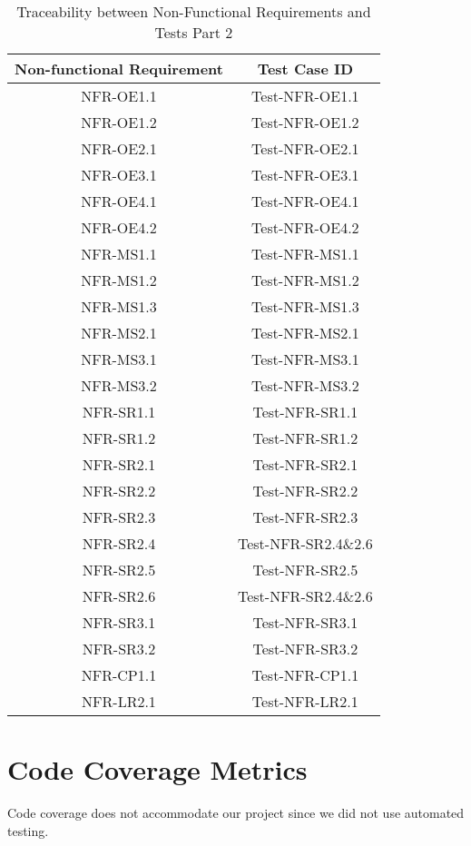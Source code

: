 \documentclass[12pt, titlepage]{article}
\begin{document}
\begin{table}[H]
    \centering
    \begin{tabular}{|c|c|}
    \hline
    Non-functional Requirement & Test Case ID\\
    \hline
    NFR-OE1.1 & Test-NFR-OE1.1\\
    \hline
    NFR-OE1.2 & Test-NFR-OE1.2\\
    \hline
    NFR-OE2.1 & Test-NFR-OE2.1\\
    \hline
    NFR-OE3.1 & Test-NFR-OE3.1\\
    \hline
    NFR-OE4.1 & Test-NFR-OE4.1\\
    \hline
    NFR-OE4.2 & Test-NFR-OE4.2\\
    \hline
    NFR-MS1.1 & Test-NFR-MS1.1\\
    \hline
    NFR-MS1.2 & Test-NFR-MS1.2\\
    \hline
    NFR-MS1.3 & Test-NFR-MS1.3\\
    \hline
    NFR-MS2.1 & Test-NFR-MS2.1\\
    \hline
    NFR-MS3.1 & Test-NFR-MS3.1\\
    \hline
    NFR-MS3.2 & Test-NFR-MS3.2\\
    \hline
    NFR-SR1.1 & Test-NFR-SR1.1\\
    \hline
    NFR-SR1.2 & Test-NFR-SR1.2\\
    \hline
    NFR-SR2.1 & Test-NFR-SR2.1\\
    \hline
    NFR-SR2.2 & Test-NFR-SR2.2\\
    \hline
    NFR-SR2.3 & Test-NFR-SR2.3\\
    \hline
    NFR-SR2.4 & Test-NFR-SR2.4\&2.6\\
    \hline
    NFR-SR2.5 & Test-NFR-SR2.5\\
    \hline
    NFR-SR2.6 & Test-NFR-SR2.4\&2.6\\
    \hline
    NFR-SR3.1 & Test-NFR-SR3.1\\
    \hline
    NFR-SR3.2 & Test-NFR-SR3.2\\
    \hline
    NFR-CP1.1 & Test-NFR-CP1.1\\
    \hline
    NFR-LR2.1 & Test-NFR-LR2.1\\
    \hline
    \end{tabular}
    \caption{Traceability between Non-Functional Requirements and Tests Part 2}
\end{table}

\newpage

\section{Code Coverage Metrics}
Code coverage does not accommodate our project since we did not use automated testing.
\end{document}
